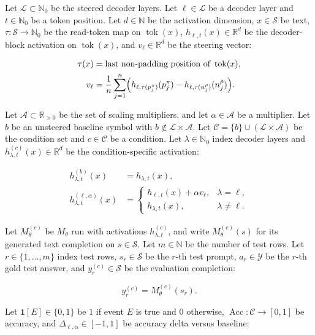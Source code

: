 \documentclass{article}
\begin{document}
Let \(\mathcal L\subset\mathbb N_0\) be the steered decoder layers.
Let \(\ell\in\mathcal L\) be a decoder layer and \(t\in\mathbb N_0\) be a token position.
Let \(d\in\mathbb N\) be the activation dimension, \(x\in\mathcal S\) be text, \(\tau:\mathcal S\to\mathbb N_0\) be the read-token map on \(\operatorname{tok}(x)\), \(h_{\ell,t}(x)\in\mathbb R^d\) be the decoder-block activation on \(\operatorname{tok}(x)\), and \(v_\ell\in\mathbb R^d\) be the steering vector:

\[
\begin{aligned}
\tau(x)&=\text{last non-padding position of }\operatorname{tok}(x),\\
v_\ell&=\frac1n\sum_{j=1}^{n}
\Bigl(h_{\ell,\tau(p^\pi_j)}(p^\pi_j)
-h_{\ell,\tau(n^\rho_j)}(n^\rho_j)\Bigr).
\end{aligned}
\]

Let \(\mathcal A\subset\mathbb R_{>0}\) be the set of scaling multipliers, and let \(\alpha\in\mathcal A\) be a multiplier.
Let \(b\) be an unsteered baseline symbol with \(b\notin\mathcal L\times\mathcal A\).
Let \(\mathcal C=\{b\}\cup(\mathcal L\times\mathcal A)\) be the condition set and \(c\in\mathcal C\) be a condition.
Let \(\lambda\in\mathbb N_0\) index decoder layers and \(h_{\lambda,t}^{(c)}(x)\in\mathbb R^d\) be the condition-specific activation:

\[
\begin{aligned}
h_{\lambda,t}^{(b)}(x)&=h_{\lambda,t}(x),\\
h_{\lambda,t}^{(\ell,\alpha)}(x)&=
\begin{cases}
h_{\ell,t}(x)+\alpha v_\ell, & \lambda=\ell,\\
h_{\lambda,t}(x), & \lambda\ne\ell.
\end{cases}
\end{aligned}
\]

Let \(M_\theta^{(c)}\) be \(M_\theta\) run with activations \(h_{\lambda,t}^{(c)}\), and write \(M_\theta^{(c)}(s)\) for its generated text completion on \(s\in\mathcal S\).
Let \(m\in\mathbb N\) be the number of test rows.
Let \(r\in\{1,\ldots,m\}\) index test rows, \(s_r\in\mathcal S\) be the \(r\)-th test prompt, \(a_r\in\mathcal Y\) be the \(r\)-th gold test answer, and \(y_r^{(c)}\in\mathcal S\) be the evaluation completion:

\[
y_r^{(c)}=M_\theta^{(c)}(s_r).
\]

Let \(\mathbf 1[E]\in\{0,1\}\) be \(1\) if event \(E\) is true and \(0\) otherwise, \(\operatorname{Acc}:\mathcal C\to[0,1]\) be accuracy, and \(\Delta_{\ell,\alpha}\in[-1,1]\) be accuracy delta versus baseline:
\end{document}
